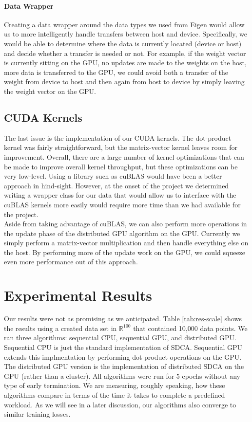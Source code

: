 \documentclass{article}
\def \R {\mathbb{R}}
\def \R {\mathbb{R}}
\begin{document}
\paragraph{Data Wrapper} Creating a data wrapper around the data types we used
from Eigen would allow us to more intelligently handle transfers between host
and device. Specifically, we would be able to determine where the data is
currently located (device or host) and decide whether a transfer is needed or
not. For example, if the weight vector is currently sitting on the GPU, no
updates are made to the weights on the host, more data is transferred to the
GPU, we could avoid both a transfer of the weight from device to host and then
again from host to device by simply leaving the weight vector on the GPU.

\subsection{CUDA Kernels}
The last issue is the implementation of our CUDA kernels. The dot-product
kernel was fairly straightforward, but the matrix-vector kernel leaves room for
improvement. Overall, there are a large number of kernel optimizations that can
be made to improve overall kernel throughput, but these optimizations can be
very low-level. Using a library such as cuBLAS would have been a better
approach in hind-sight. However, at the onset of the project we determined
writing a wrapper class for our data that would allow us to interface with the
cuBLAS kernels more easily would require more time than we had available for
the project.\\

Aside from taking advantage of cuBLAS, we can also perform more operations in
the update phase of the distributed GPU algorithm on the GPU. Currently we
simply perform a matrix-vector multiplication and then handle everything else on
the host. By performing more of the update work on the GPU, we could squeeze
even more performance out of this approach.

\section{Experimental Results}
Our results were not as promising as we anticipated. Table \ref{tab:res-scale}
shows the results using a created data set in $\R^{100}$ that contained 10,000
data points. We ran three algorithms: sequential CPU, sequential GPU, and
distributed GPU. Sequential CPU is just the standard implementation of SDCA.
Sequential GPU extends this implmentation by performing dot product operations
on the GPU. The distributed GPU version is the implementation of distributed
SDCA on the GPU (rather than a cluster). All algorithms were run for 5 epochs
without any type of early termination. We are measuring, roughly speaking, how
these algorithms compare in terms of the time it takes to complete a predefined
workload. As we will see in a later discussion, our algorithms also converge to
similar training losses.
\end{document}
